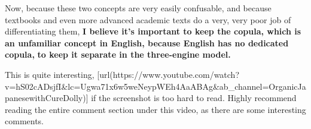 {}

Now, because these two concepts are very easily confusable, and because textbooks and even more advanced academic texts do a very, very poor job of differentiating them, {\bf I believe it's important to keep the copula, which is} {\bf an unfamiliar concept in English, because English has no dedicated copula,} {\bf to keep it separate in the three-engine model.}

This is quite interesting, [url(https://www.youtube.com/watch?v=hS02cADsjfI&lc=Ugwa71x6w5weNeypWEh4AaABAg&ab_channel=OrganicJapanesewithCureDolly)] if the screenshot is too hard to read. Highly recommend reading the entire comment section under this video, as there are some interesting comments.

{}

\stopsectionlevel

\stopsectionlevel

\stopsectionlevel

\stopsectionlevel
